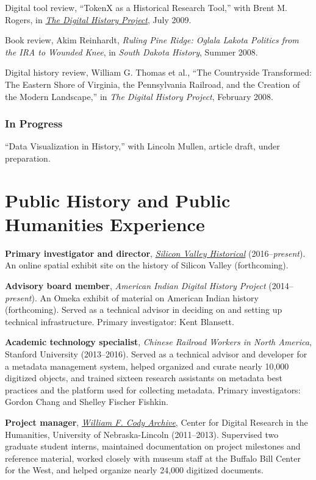 Digital tool review, ``TokenX as a Historical Research Tool,'' with
Brent M. Rogers, in
\emph{\href{http://digitalhistory.unl.edu/t-reviews/tokenxhepplerrogers.php}{The
Digital History Project}}, July 2009.

Book review, Akim Reinhardt, \emph{Ruling Pine Ridge: Oglala Lakota
Politics from the IRA to Wounded Knee}, in \emph{South Dakota History},
Summer 2008.

Digital history review, William G. Thomas et al., ``The Countryside
Transformed: The Eastern Shore of Virginia, the Pennsylvania Railroad,
and the Creation of the Modern Landscape,'' in \emph{The Digital History
Project}, February 2008.

\subsubsection{In Progress}\label{in-progress}

``Data Visualization in History,'' with Lincoln Mullen, article draft,
under preparation.

\section{Public History and Public Humanities
Experience}\label{public-history-and-public-humanities-experience}

\textbf{Primary investigator and director},
\emph{\href{http://svhistorical.org}{Silicon Valley Historical}}
(2016--\emph{present}). An online spatial exhibit site on the history of
Silicon Valley (forthcoming).

\textbf{Advisory board member}, \emph{American Indian Digital History
Project} (2014--\emph{present}). An Omeka exhibit of material on
American Indian history (forthcoming). Served as a technical advisor in
deciding on and setting up technical infrastructure. Primary
investigator: Kent Blansett.

\textbf{Academic technology specialist}, \emph{Chinese Railroad Workers
in North America}, Stanford University (2013--2016). Served as a
technical advisor and developer for a metadata management system, helped
organized and curate nearly 10,000 digitized objects, and trained
sixteen research assistants on metadata best practices and the platform
used for collecting metadata. Primary investigators: Gordon Chang and
Shelley Fischer Fishkin.

\textbf{Project manager}, \emph{\href{http://codyarchive.org}{William F.
Cody Archive}}, Center for Digital Research in the Humanities,
University of Nebraska-Lincoln (2011--2013). Supervised two graduate
student interns, maintained documentation on project milestones and
reference material, worked closely with museum staff at the Buffalo Bill
Center for the West, and helped organize nearly 24,000 digitized
documents.

